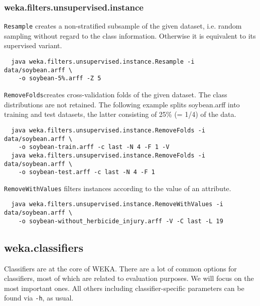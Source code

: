 \subsubsection*{weka.filters.unsupervised.instance}

\texttt{Resample} creates a non-stratified subsample of the given dataset, i.e. random sampling without regard to the class information. Otherwise it is equivalent to its supervised variant.

{\scriptsize
\begin{verbatim}
  java weka.filters.unsupervised.instance.Resample -i data/soybean.arff \
    -o soybean-5%.arff -Z 5
\end{verbatim}}

\noindent \texttt{RemoveFolds}creates cross-validation folds of the given dataset. The class distributions are not retained. The following example splits soybean.arff into training and test datasets, the latter consisting of 25\% (= 1/4) of the data.

{\scriptsize
\begin{verbatim}
  java weka.filters.unsupervised.instance.RemoveFolds -i data/soybean.arff \
    -o soybean-train.arff -c last -N 4 -F 1 -V
  java weka.filters.unsupervised.instance.RemoveFolds -i data/soybean.arff \
    -o soybean-test.arff -c last -N 4 -F 1
\end{verbatim}}

\noindent \texttt{RemoveWithValues} filters instances according to the value of an attribute.

{\scriptsize
\begin{verbatim}
  java weka.filters.unsupervised.instance.RemoveWithValues -i data/soybean.arff \
    -o soybean-without_herbicide_injury.arff -V -C last -L 19
\end{verbatim}}

\newpage
\subsection{weka.classifiers}

Classifiers are at the core of WEKA. There are a lot of common options for classifiers, most of which are related to evaluation purposes. We will focus on the most important ones. All others including classifier-specific parameters can be found via \texttt{-h}, as usual.

